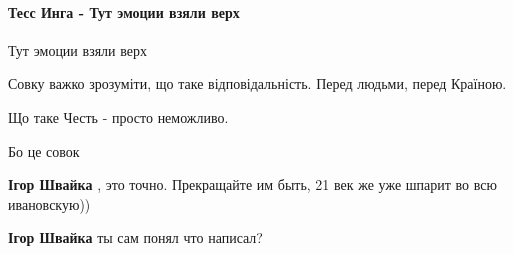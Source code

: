  
 
 
 
 
\paragraph{Тесс Инга - Тут эмоции взяли верх}
\label{sec:12_08_2021.fb.buzhanskii_max.1.maguchih.cmt.tess_inga_emocii}

\begin{itemize}
 
Тут эмоции взяли верх

 

Совку важко зрозуміти, що таке відповідальність. Перед людьми, перед Країною.

Що таке Честь - просто неможливо.

Бо це совок 🙏

\begin{itemize}
 
\textbf{Ігор Швайка} , это точно.
Прекращайте им быть, 21 век же уже шпарит во всю ивановскую))

 
\textbf{Ігор Швайка} ты сам понял что написал?


\end{itemize}
\end{itemize}
